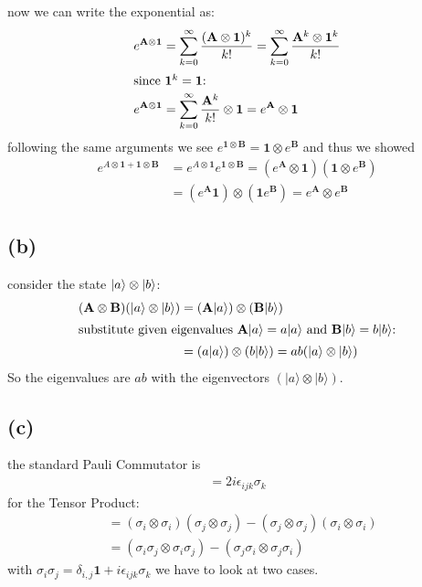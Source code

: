 \documentclass{article}
\begin{document}
now we can write the exponential as:
\begin{align}
    e^{\mathbf{A}\otimes \mathbf{1}}&= \sum^\infty_{k=0}\frac{(\mathbf{A}\otimes\mathbf{1})^k}{k!}=\sum^\infty_{k=0}\frac{\mathbf{A}^k\otimes\mathbf{1}^k}{k!}\\
    \intertext{since $\mathbf{1}^k=\mathbf{1}$:}e^{\mathbf{A}\otimes \mathbf{1}}&=\sum^\infty_{k=0}\frac{\mathbf{A}^k}{k!}\otimes\mathbf{1}=e^\mathbf{A}\otimes\mathbf{1}
\end{align}
following the same arguments we see $e^{\mathbf{1}\otimes \mathbf{B}}=\mathbf{1}\otimes e^\mathbf{B}$ and thus we showed
\begin{align}
    e^{A\otimes \mathbf{1}+\mathbf{1}\otimes \mathbf{B}}&=e^{A\otimes \mathbf{1}}e^{\mathbf{1}\otimes \mathbf{B}}= (e^\mathbf{A}\otimes\mathbf{1})(\mathbf{1}\otimes e^\mathbf{B})\\
    &=(e^\mathbf{A}\mathbf{1})\otimes(\mathbf{1}e^\mathbf{B})=e^\mathbf{A}\otimes e^\mathbf{B}
\end{align}

\subsection*{(b)}
consider the state $\ket{a}\otimes\ket{b}$:
\begin{align}
    (\mathbf{A} \otimes \mathbf{B})(|a\rangle \otimes |b\rangle) &= (\mathbf{A}|a\rangle) \otimes (\mathbf{B}|b\rangle)\\
   \intertext{substitute given eigenvalues $\mathbf{A}|a\rangle = a|a\rangle$ and $\mathbf{B}|b\rangle = b|b\rangle$:} &=(a|a\rangle) \otimes (b|b\rangle) = ab(|a\rangle \otimes |b\rangle) 
\end{align}
So the eigenvalues are $ab$ with the eigenvectors $(|a\rangle \otimes |b\rangle)$.

\subsection*{(c)}
the standard Pauli Commutator is
\begin{align}
    [\sigma_i, \sigma_j] = 2i \epsilon_{ijk} \sigma_k
\end{align}
for the Tensor Product:
\begin{align}
    [\sigma_i \otimes \sigma_i, \sigma_j \otimes \sigma_j] &= (\sigma_i \otimes \sigma_i)(\sigma_j \otimes \sigma_j) - (\sigma_j \otimes \sigma_j)(\sigma_i \otimes \sigma_i)\\
    &=(\sigma_i \sigma_j \otimes \sigma_i \sigma_j) - (\sigma_j \sigma_i \otimes \sigma_j \sigma_i)
\end{align}
with $\sigma_i \sigma_j=\delta_{i,j}\mathbf{1}+i \epsilon_{ijk} \sigma_k$ we have to look at two cases.
\end{document}
